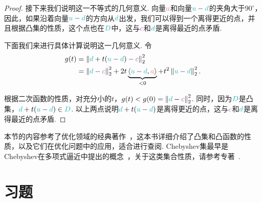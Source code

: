 \begin{proof}
    接下来我们说明这一不等式的几何意义. 向量$\textcolor{Salmon}{a}$和向量$\contrastlight{u} - \contrastlight{d}$的夹角大于$90^\circ$，因此，如果沿着向量$\contrastlight{u} - \contrastlight{d}$的方向从$\contrastlight{d}$出发，我们可以得到一个离得更近的点，并且根据凸集的性质，这个点也在$\contrastlight{D}$中，这与$\light{c}$和$\contrastlight{d}$是离得最近的点矛盾.
    
    下面我们来进行具体计算说明这一几何意义. 令
    \begin{align*}
        g(t) &= \norm{\contrastlight{d} + t (\contrastlight{u} - \contrastlight{d}) - \light{c}}_2^2\\
        &= \norm{\contrastlight{d} - \light{c}}_2^2 + 2t \underbrace{\inner{\contrastlight{u} - \contrastlight{d}}{\textcolor{Salmon}{a}}}_{< 0} + t^2 \norm{\contrastlight{u} - \contrastlight{d}}_2^2.
    \end{align*}
    
    根据二次函数的性质，对充分小的$t$，$g(t) < g(0) = \norm{\contrastlight{d} - \light{c}}_2^2$. 同时，因为$\contrastlight{D}$是凸集，$\contrastlight{d} + t(\contrastlight{u} - \contrastlight{d}) \in \contrastlight{D}$. 以上两点说明$\contrastlight{d} + t(\contrastlight{u} - \contrastlight{d})$是离得更近的点，这与$\light{c}$和$\contrastlight{d}$是离得最近的点矛盾.
\end{proof}

\begin{remark}
    本节的内容参考了优化领域的经典著作~\cite{boydConvexOptimization2004}，这本书详细介绍了凸集和凸函数的性质，以及它们在优化问题中的应用，适合进行查阅. Chebyshev集最早是Chebyshev在多项式逼近中提出的概念~\cite{chebyshevQuestionsSmallestQuantities1947}，关于这类集合性质，请参考专著~\cite{bauschkeConvexAnalysisMonotone2017}.
\end{remark}

\section{习题}


